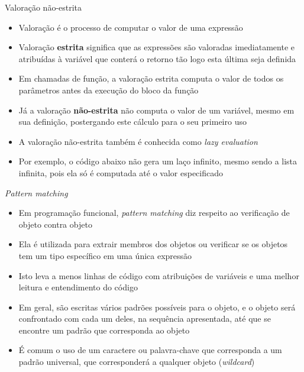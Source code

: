 \begin{frame}[fragile]{Valoração não-estrita}

    \begin{itemize}
        \item Valoração é o processo de computar o valor de uma expressão

        \item Valoração \textbf{estrita} significa que as expressões são valoradas imediatamente e
            atribuídas à variável que conterá o retorno tão logo esta última seja definida

        \item Em chamadas de função, a valoração estrita computa o valor de todos os parâmetros
            antes da execução do bloco da função

        \item Já a valoração \textbf{não-estrita} não computa o valor de um variável, mesmo em
            sua definição, postergando este cálculo para o seu primeiro uso

        \item A valoração não-estrita também é conhecida como \textit{lazy evaluation}

        \item Por exemplo, o código abaixo não gera um laço infinito, mesmo sendo a lista
            infinita, pois ela só é computada até o valor especificado

    \end{itemize}

\end{frame}

\begin{frame}[fragile]{\it Pattern matching}

    \begin{itemize}
        \item Em programação funcional, \textit{pattern matching} diz respeito ao verificação de
            objeto contra objeto

        \item Ela é utilizada para extrair membros dos objetos ou verificar se os objetos tem
            um tipo específico em uma única expressão

        \item Isto leva a menos linhas de código com atribuições de variáveis e uma melhor
            leitura e entendimento do código

        \item Em geral, são escritas vários padrões possíveis para o objeto, e o objeto será
            confrontado com cada um deles, na sequência apresentada, até que se encontre
            um padrão que corresponda ao objeto

        \item É comum o uso de um caractere ou palavra-chave que corresponda a um padrão
            universal, que corresponderá a qualquer objeto (\textit{wildcard})


    \end{itemize}

\end{frame}
